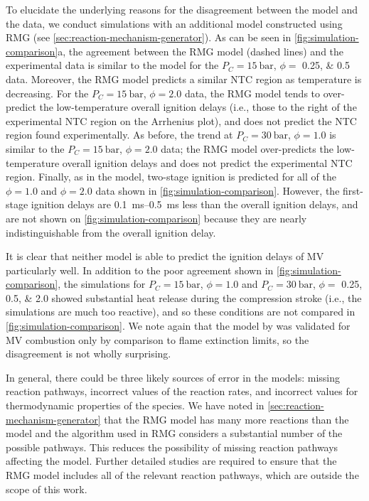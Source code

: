 \documentclass[letterpaper, review, sort&compress]{elsarticle}
\begin{document}
To elucidate the underlying reasons for the disagreement between the \citet{Dievart2013} model and
the data, we conduct simulations with an additional model constructed using RMG (see
\cref{sec:reaction-mechanism-generator}). As can be seen in \cref{fig:simulation-comparison}a, the
agreement between the RMG model (dashed lines) and the experimental data is similar to the
\citet{Dievart2013} model for the \(P_C = \SI{15}{\bar}\), \(\phi =\) \numlist{0.25; 0.5} data.
Moreover, the RMG model predicts a similar NTC region as temperature is decreasing. For the \(P_C =
\SI{15}{\bar}\), \(\phi = 2.0\) data, the RMG model tends to over-predict the low-temperature
overall ignition delays (i.e., those to the right of the experimental NTC region on the Arrhenius
plot), and does not predict the NTC region found experimentally. As before, the trend at \(P_C =
\SI{30}{\bar}\), \(\phi=1.0\) is similar to the \(P_C = \SI{15}{\bar}\), \(\phi=2.0\) data; the RMG
model over-predicts the low-temperature overall ignition delays and does not predict the
experimental NTC region. Finally, as in the \citet{Dievart2013} model, two-stage ignition is
predicted for all of the \(\phi=1.0\) and \(\phi=2.0\) data shown in
\cref{fig:simulation-comparison}. However, the first-stage ignition delays are
\SIrange{0.1}{0.5}{\ms} less than the overall ignition delays, and are not shown on
\cref{fig:simulation-comparison} because they are nearly indistinguishable from the overall ignition
delay.

It is clear that neither model is able to predict the ignition delays of MV particularly well. In
addition to the poor agreement shown in \cref{fig:simulation-comparison}, the simulations for
\(P_C = \SI{15}{\bar}\), \(\phi=1.0\) and \(P_C = \SI{30}{\bar}\), \(\phi=\) \numlist{0.25;0.5;2.0}
showed substantial heat release during the compression stroke (i.e., the simulations are much too
reactive), and so these conditions are not compared in \cref{fig:simulation-comparison}. We note
again that the model by \citet{Dievart2013} was validated for MV combustion only by comparison to
flame extinction limits, so the disagreement is not wholly surprising.

In general, there could be three likely sources of error in the models: missing reaction pathways,
incorrect values of the reaction rates, and incorrect values for thermodynamic properties of the
species. We have noted in \cref{sec:reaction-mechanism-generator} that the RMG model has many more
reactions than the \citet{Dievart2013} model and the algorithm used in RMG considers a substantial
number of the possible pathways. This reduces the possibility of missing reaction pathways affecting
the model. Further detailed studies are required to ensure that the RMG model includes all of the
relevant reaction pathways, which are outside the scope of this work.
\end{document}

